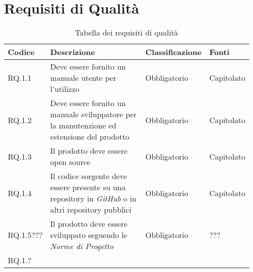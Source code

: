 \section{Requisiti di Qualità}
\begin{table}[H]
  \centering
  \begin{tabular}{|p{}|p{6cm}|p{3cm}|p{2cm}|}
    \hline
    \rowcolor[HTML]{036400}
    {\color[HTML]{FFFFFF} \textbf{Codice}} & {\color[HTML]{FFFFFF} \textbf{Descrizione}} & {\color[HTML]{FFFFFF} \textbf{Classificazione}} & {\color[HTML]{FFFFFF} \textbf{Fonti}} \\ \hline
    \rowcolor[HTML]{EFEFEF}
    RQ.1.1 & Deve essere fornito un manuale utente per l'utilizzo & Obbligatorio & Capitolato \\ \hline
    \rowcolor[HTML]{C0C0C0}
    RQ.1.2 & Deve essere fornito un manuale sviluppatore per la manutenzione ed estensione del prodotto & Obbligatorio & Capitolato \\ \hline
    \rowcolor[HTML]{EFEFEF}
    RQ.1.3 & Il prodotto deve essere open source & Obbligatorio & Capitolato \\ \hline
    \rowcolor[HTML]{C0C0C0}
    RQ.1.4 & Il codice sorgente deve essere presente su una repository in \textit{GitHub} o in altri repository pubblici & Obbligatorio & Capitolato \\ \hline
    \rowcolor[HTML]{EFEFEF}
    RQ.1.5??? & Il prodotto deve essere sviluppato seguendo le \textit{Norme di Progetto} & Obbligatorio & ??? \\ \hline
    \rowcolor[HTML]{C0C0C0}
    RQ.1.? &  &  &  \\ \hline
  \end{tabular}
  \caption{Tabella dei requisiti di qualità}
\end{table}


